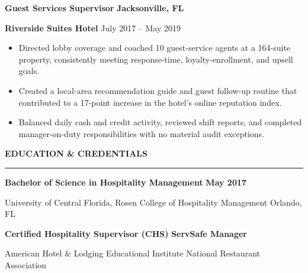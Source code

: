 \documentclass[10pt,letterpaper]{article}
\newcommand{\resumesection}[1]{%
  \vspace{6pt}%
  {\large\bfseries\color{navy}\MakeUppercase{#1}}\par
  \vspace{1.5pt}%
  {\color{navy}\rule{\linewidth}{1.05pt}}\par
  \vspace{3pt}%
}
\newcommand{\role}[4]{%
  \textbf{#1} \hfill {\small\bfseries #2}\par
  {\color{navy}\bfseries #3} \hfill {\small\color{slate} #4}\par
  \vspace{-1pt}%
}
\newcommand{\education}[4]{%
  \textbf{#1} \hfill {\small\bfseries #2}\par
  {\color{slate}#3} \hfill {\small\color{slate} #4}\par
}
\begin{document}
\vspace{2.5pt}
\role{Guest Services Supervisor}{Jacksonville, FL}{Riverside Suites Hotel}{July 2017 -- May 2019}
\begin{itemize}
  \item Directed lobby coverage and coached 10 guest-service agents at a 164-suite property, consistently meeting response-time, loyalty-enrollment, and upsell goals.
  \item Created a local-area recommendation guide and guest follow-up routine that contributed to a 17-point increase in the hotel's online reputation index.
  \item Balanced daily cash and credit activity, reviewed shift reports, and completed manager-on-duty responsibilities with no material audit exceptions.
\end{itemize}

\resumesection{Education \& Credentials}
\education{Bachelor of Science in Hospitality Management}{May 2017}{University of Central Florida, Rosen College of Hospitality Management}{Orlando, FL}
\vspace{3pt}
\textbf{Certified Hospitality Supervisor (CHS)} \hfill \textbf{ServSafe Manager}\par
{\color{slate}American Hotel \& Lodging Educational Institute} \hfill {\color{slate}National Restaurant Association}
\end{document}
